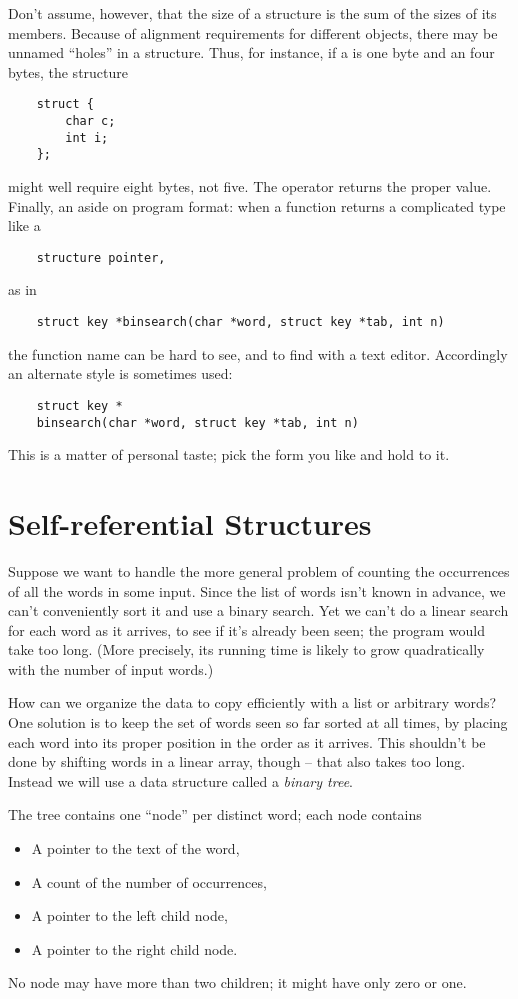 Don't assume, however, that the size of a structure is the sum of the sizes of its members.
Because of alignment requirements for different objects, there may be unnamed ``holes'' in a structure.
Thus, for instance, if a  is one byte and an  four bytes, the structure
\begin{lstlisting}
	struct {
		char c;
		int i;
	};
\end{lstlisting}
might well require eight bytes, not five.
The  operator returns the proper value.
Finally, an aside on program format: when a function returns a complicated type like a
\begin{lstlisting}
	structure pointer,
\end{lstlisting}
as in
\begin{lstlisting}
	struct key *binsearch(char *word, struct key *tab, int n)
\end{lstlisting}
the function name can be hard to see, and to find with a text editor.
Accordingly an alternate style is sometimes used:
\begin{lstlisting}
	struct key *
	binsearch(char *word, struct key *tab, int n)
\end{lstlisting}
This is a matter of personal taste; pick the form you like and hold to it.



\section{Self-referential Structures}

Suppose we want to handle the more general problem of counting the occurrences of all the words in some input.
Since the list of words isn't known in advance, we can't conveniently sort it and use a binary search.
Yet we can't do a linear search for each word as it arrives, to see if it's already been seen; the program would take too long.
(More precisely, its running time is likely to grow quadratically with the number of input words.)

How can we organize the data to copy efficiently with a list or arbitrary words?
One solution is to keep the set of words seen so far sorted at all times, by placing each word into its proper position in the order as it arrives.
This shouldn't be done by shifting words in a linear array, though -- that also takes too long.
Instead we will use a data structure called a \emph{binary tree}.

The tree contains one ``node'' per distinct word; each node contains
\begin{itemize}[nolistsep]
\item A pointer to the text of the word,
\item A count of the number of occurrences,
\item A pointer to the left child node,
\item A pointer to the right child node.
\end{itemize}
No node may have more than two children; it might have only zero or one.

